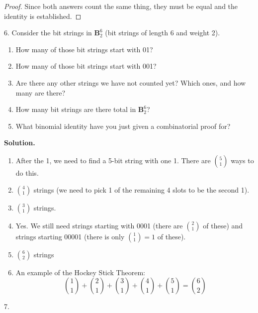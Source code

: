 \documentclass[10pt,]{book}
\theoremstyle{plain}
\theoremstyle{definition}
\theoremstyle{definition}
\theoremstyle{definition}
\numberwithin{equation}{section}
\def\B{\mathbf{B}}
\begin{document}
\begin{exerciselist}
\begin{proof}
            Since both answers count the same thing, they must be equal and the identity is established.
\end{proof}
\item[6.]\hypertarget{exercise-77}{}
          Consider the bit strings in \(\B^6_2\) (bit strings of length 6 and weight 2).
\leavevmode%
\begin{enumerate}[label=(\alph*)]
\item\hypertarget{li-532}{} How many of those bit strings start with 01? %
\item\hypertarget{li-533}{} How many of those bit strings start with 001? %
\item\hypertarget{li-534}{} Are there any other strings we have not counted yet?  Which ones, and how many are there? %
\item\hypertarget{li-535}{} How many bit strings are there total in \(\B^6_2\)? %
\item\hypertarget{li-536}{} What binomial identity have you just given a combinatorial proof for? %
\end{enumerate}
\par\smallskip
\par\smallskip
\noindent\textbf{Solution.}\hypertarget{solution-114}{}\quad
\leavevmode%
\begin{enumerate}[label=(\alph*)]
\item\hypertarget{li-537}{} After the 1, we need to find a 5-bit string with one 1.  There are \({5 \choose 1}\) ways to do this. %
\item\hypertarget{li-538}{}\({4 \choose 1}\) strings (we need to pick 1 of the remaining 4 slots to be the second 1).%
\item\hypertarget{li-539}{}\({3 \choose 1}\) strings.%
\item\hypertarget{li-540}{} Yes.  We still need strings starting with 0001 (there are \({2 \choose 1}\) of these) and strings starting 00001 (there is only \({1 \choose 1} = 1\) of these). %
\item\hypertarget{li-541}{}\({6 \choose 2}\) strings%
\item\hypertarget{li-542}{} An example of the Hockey Stick Theorem: \begin{equation*} {1 \choose 1} + {2 \choose 1} + {3 \choose 1} + {4 \choose 1} + {5 \choose 1} = {6 \choose 2} \end{equation*} %
\end{enumerate}
\item[7.]\hypertarget{exercise-78}{}

\end{exerciselist}
\end{document}
